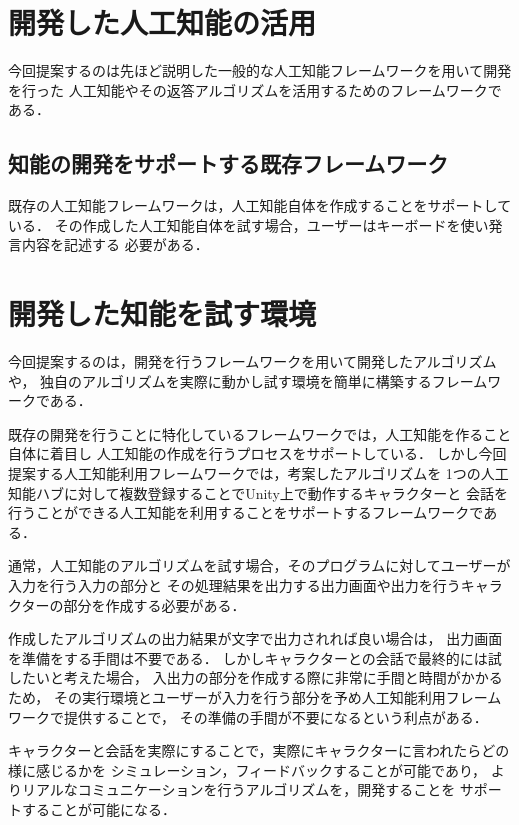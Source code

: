 \section{開発した人工知能の活用}
今回提案するのは先ほど説明した一般的な人工知能フレームワークを用いて開発を行った
人工知能やその返答アルゴリズムを活用するためのフレームワークである．
\subsection{知能の開発をサポートする既存フレームワーク}
既存の人工知能フレームワークは，人工知能自体を作成することをサポートしている．
その作成した人工知能自体を試す場合，ユーザーはキーボードを使い発言内容を記述する
必要がある．

\section{開発した知能を試す環境}
今回提案するのは，開発を行うフレームワークを用いて開発したアルゴリズムや，
独自のアルゴリズムを実際に動かし試す環境を簡単に構築するフレームワークである．

既存の開発を行うことに特化しているフレームワークでは，人工知能を作ること自体に着目し
人工知能の作成を行うプロセスをサポートしている．
しかし今回提案する人工知能利用フレームワークでは，考案したアルゴリズムを
1つの人工知能ハブに対して複数登録することでUnity上で動作するキャラクターと
会話を行うことができる人工知能を利用することをサポートするフレームワークである．

通常，人工知能のアルゴリズムを試す場合，そのプログラムに対してユーザーが入力を行う入力の部分と
その処理結果を出力する出力画面や出力を行うキャラクターの部分を作成する必要がある．

作成したアルゴリズムの出力結果が文字で出力されれば良い場合は，
出力画面を準備をする手間は不要である．
しかしキャラクターとの会話で最終的には試したいと考えた場合，
入出力の部分を作成する際に非常に手間と時間がかかるため，
その実行環境とユーザーが入力を行う部分を予め人工知能利用フレームワークで提供することで，
その準備の手間が不要になるという利点がある．

キャラクターと会話を実際にすることで，実際にキャラクターに言われたらどの様に感じるかを
シミュレーション，フィードバックすることが可能であり，
よりリアルなコミュニケーションを行うアルゴリズムを，開発することを
サポートすることが可能になる．


